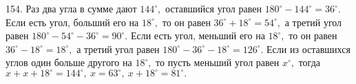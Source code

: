 154. Раз два угла в сумме дают $144^\circ,$ оставшийся угол равен $180^\circ-144^\circ=36^\circ.$ Если есть угол, больший его на $18^\circ,$ то он равен $36^\circ+18^\circ=54^\circ,$ а третий угол равен $180^\circ-54^\circ-36^\circ=90^\circ.$ Если есть угол, меньший его на $18^\circ,$ то он равен $36^\circ-18^\circ=18^\circ,$ а третий угол равен
$180^\circ-36^\circ-18^\circ=126^\circ.$ Если из оставшихся углов один больше другого на $18^\circ,$ то пусть меньший угол равен $x^\circ,$ тогда
$x+x+18^\circ=144^\circ,\ x=63^\circ,\ x+18^\circ=81^\circ.$\\
